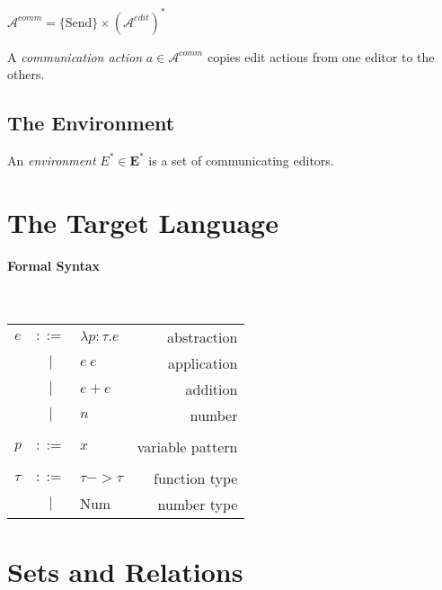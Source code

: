 \documentclass[letterpaper,12pt]{report}
\makeatletter
\newenvironment{Grammar}
{
  \begin{tabular*}{\textwidth}{
    >{$}l<{$}
    >{$}c<{$}
    >{$}l<{$}
    @{\extracolsep{\fill}}
    r}
}{
  \end{tabular*}
}
\newcommand\OR{\ensuremath{~|~}}
\def\A{\mathcal{A}}
\def\Ebf{\textbf{E}}
\def\Num{\text{Num}}
\def\Send{\text{Send}}
\makeatother
\begin{document}
$\A^{comm} = \{ \Send \} \times (\A^{edit})^{*}$

A \emph{communication action} $a \in \A^{comm}$ copies edit actions from one
editor to the others.

\subsection{The Environment}
\label{sec:the-environment}

An \emph{environment} $E^{*} \in \Ebf^{*}$ is a set of communicating editors.


\section{The Target Language}
\label{sec:the-target-language}

\paragraph{Formal Syntax} ~

\begin{minipage}[t]{0.5\textwidth}
  \vspace{0pt}
  \begin{Grammar}
    e
    & ::= & \lambda p : \tau.e & abstraction \\
    & \OR & e~e                & application \\
    & \OR & e+e                & addition    \\
    & \OR & n                  & number      \\
    \\
    p
    & ::= & x & variable pattern \\
    \\
    \tau
    & ::= & \tau -> \tau & function type \\
    & \OR & \Num         & number type   \\
  \end{Grammar}
\end{minipage}


\section{Sets and Relations}
\label{sec:sets-and-relations}
\end{document}
